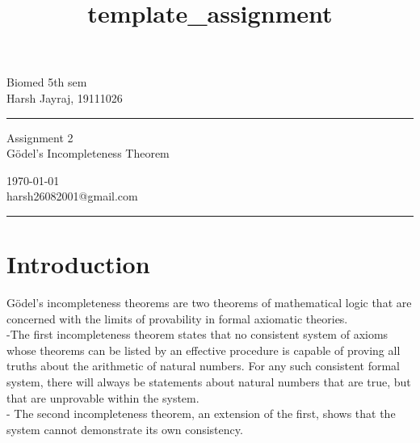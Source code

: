 \documentclass[a4paper,10pt]{article} %
\begin{document}

\title{template_assignment} %
\fancyhead[C]{}
\begin{minipage}{0.295\textwidth} %
\raggedright
Biomed 5th sem\\ %
\footnotesize %
Harsh Jayraj, 19111026 %
\medskip\hrule
\end{minipage}
\begin{minipage}{0.4\textwidth} %
\centering 
\large %
Assignment 2\\ %
\normalsize %
Gödel's Incompleteness Theorem\\ %
\end{minipage}
\begin{minipage}{0.295\textwidth} %
\raggedleft
\today\\ %
\footnotesize %
harsh26082001@gmail.com%
\medskip\hrule
\end{minipage}


\section{Introduction}
Gödel's incompleteness theorems are two theorems of mathematical logic that are concerned with the limits of provability in formal axiomatic theories. \\
-The first incompleteness theorem states that no consistent system of axioms whose theorems can be listed by an effective procedure is capable of proving all truths about the arithmetic of natural numbers. For any such consistent formal system, there will always be statements about natural numbers that are true, but that are unprovable within the system.\\- The second incompleteness theorem, an extension of the first, shows that the system cannot demonstrate its own consistency.
\end{document}
